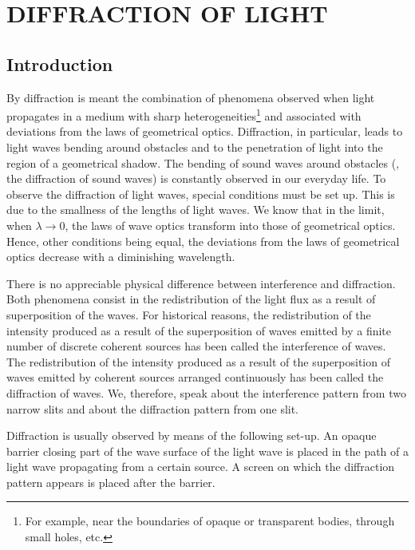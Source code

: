 

\chapter[DIFFRACTION OF LIGHT]{DIFFRACTION OF LIGHT}\label{chap:18}

\section{Introduction}\label{sec:18_1}

By diffraction is meant the combination of phenomena observed when light propagates in a medium with sharp heterogeneities\footnote{For example, near the boundaries of opaque or transparent bodies, through small holes, etc.} and associated with deviations from the laws of geometrical optics.
Diffraction, in particular, leads to light waves bending around obstacles and to the penetration of light into the region of a geometrical shadow.
The bending of sound waves around obstacles (\ie, the diffraction of sound waves) is constantly observed in our everyday life.
To observe the diffraction of light waves, special conditions must be set up.
This is due to the smallness of the lengths of light waves.
We know that in the limit, when $\lambda\to 0$, the laws of wave optics transform into those of geometrical optics.
Hence, other conditions being equal, the deviations from the laws of geometrical optics decrease with a diminishing wavelength.

There is no appreciable physical difference between interference and diffraction.
Both phenomena consist in the redistribution of the light flux as a result of superposition of the waves.
For historical reasons, the redistribution of the intensity produced as a result of the superposition of waves emitted by a finite number of discrete coherent sources has been called the interference of waves.
The redistribution of the intensity produced as a result of the superposition of waves emitted by coherent sources arranged continuously has been called the diffraction of waves.
We, therefore, speak about the interference pattern from two narrow slits and about the diffraction pattern from one slit.

Diffraction is usually observed by means of the following set-up.
An opaque barrier closing part of the wave surface of the light wave is placed in the path of a light wave propagating from a certain source.
A screen on which the diffraction pattern appears is placed after the barrier.

